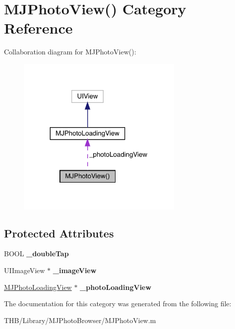 \hypertarget{category_m_j_photo_view_07_08}{}\section{M\+J\+Photo\+View() Category Reference}
\label{category_m_j_photo_view_07_08}


Collaboration diagram for M\+J\+Photo\+View()\+:\nopagebreak
\begin{figure}[H]
\begin{center}
\leavevmode
\includegraphics[width=227pt]{category_m_j_photo_view_07_08__coll__graph}
\end{center}
\end{figure}
\subsection*{Protected Attributes}
\begin{DoxyCompactItemize}
\item 
\mbox{\label{category_m_j_photo_view_07_08_aed210a6d5a14f4cb3d17827a5c7f1782}} 
B\+O\+OL {\bfseries \+\_\+double\+Tap}
\item 
\mbox{\label{category_m_j_photo_view_07_08_a01c87913edf1929f2c03da88811480bb}} 
U\+I\+Image\+View $\ast$ {\bfseries \+\_\+image\+View}
\item 
\mbox{\label{category_m_j_photo_view_07_08_aeb4392bbbc16a67b8dcc9fe47a89d120}} 
\mbox{\hyperlink{interface_m_j_photo_loading_view}{M\+J\+Photo\+Loading\+View}} $\ast$ {\bfseries \+\_\+photo\+Loading\+View}
\end{DoxyCompactItemize}


The documentation for this category was generated from the following file\+:\begin{DoxyCompactItemize}
\item 
T\+H\+B/\+Library/\+M\+J\+Photo\+Browser/M\+J\+Photo\+View.\+m\end{DoxyCompactItemize}
